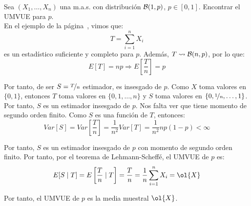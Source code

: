 \begin{ejemplo}
    Sea $(X_1, \ldots, X_n)$ una m.a.s. con distribución $\mathcal{B}(1, p)$, $p \in \left[0, 1\right]$. Encontrar el UMVUE para $p$.\\

    En el ejemplo de la página~\pageref{ejemplo:suficiencia-completitud-Bernoulli}, vimos que:
    \begin{equation*}
        T = \sum_{i=1}^{n} X_i
    \end{equation*}
    es un estadístico suficiente y completo para $p$. Además, $T\rightsquigarrow \mathcal{B}(n, p)$, por lo que:
    \begin{equation*}
        E[T] = np
        \Longrightarrow
        E\left[\dfrac{T}{n}\right] = p
    \end{equation*}

    Por tanto, de ser $S = \nicefrac{T}{n}$ estimador, es insesgado de $p$. Como $X$ toma valores en $\{0, 1\}$, entonces $T$ toma valores en $\{0, 1, \ldots, n\}$ y $S$ toma valores en $\left\{0, \nicefrac{1}{n}, \ldots, 1\right\}$. Por tanto, $S$ es un estimador insesgado de $p$. Nos falta ver que tiene momento de segundo orden finito. Como $S$ es una función de $T$, entonces:
    \begin{equation*}
        Var[S] = Var\left[\dfrac{T}{n}\right] = \dfrac{1}{n^2} Var[T] = \dfrac{1}{n^2} np(1-p)<\infty
    \end{equation*}

    Por tanto, $S$ es un estimador insesgado de $p$ con momento de segundo orden finito. Por tanto, por el teorema de Lehmann-Scheffé, el UMVUE de $p$ es:
    \begin{equation*}
        E[S \mid T] = E\left[\dfrac{T}{n} \mid T\right] = \dfrac{T}{n} 
        = \dfrac{1}{n} \sum_{i=1}^{n} X_i = \ol{X}
    \end{equation*}

    Por tanto, el UMVUE de $p$ es la media muestral $\ol{X}$.
\end{ejemplo}

